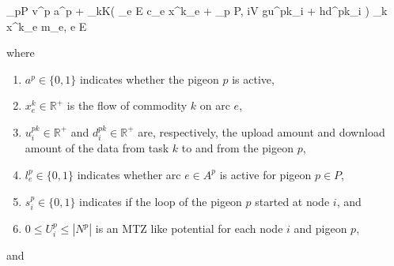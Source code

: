 \documentclass{article}
\begin{document}
	
	\begin{mini!}[3]
		{}
		{
			\sum_{p\in P} v^p a^p   +
			\sum_{k\in K}\left(
			\sum_{e \in E} c_e x^k_e + \sum_{p \in P, i\in V} gu^{pk}_{i} + hd^{pk}_{i}
			\right)
		}
		{}
		{}
		\addConstraint
			{\sum_{k} x^k_e \leq}
			{m_e,}
			{ \quad e \in E \label{eqs:land_const} }
	\end{mini!}
	where
	\begin{enumerate}
		\item $a^p \in \{0, 1\}$ indicates whether the pigeon $p$ is active,
		\item $x^k_e \in \mathbb{R}^+$ is the flow of commodity $k$ on arc $e$,
		\item $u^{pk}_i \in \mathbb{R}^+$ and $d^{pk}_i\in \mathbb{R}^+$ are, respectively, the upload amount and download amount of the data from task $k$ to and from the pigeon $p$,
		\item $l^p_e \in \{0, 1\}$ indicates whether arc $e \in A^p$ is active for pigeon $p \in P$,
		\item $s^p_i \in \{0, 1\}$ indicates if the loop of the pigeon $p$ started at node $i$, and
		\item $0 \leq U^p_i \leq |N^p|$ is an MTZ \cite{millerIntegerProgrammingFormulation1960} like potential for each node $i$ and pigeon $p$,
	\end{enumerate}
	and
\end{document}
